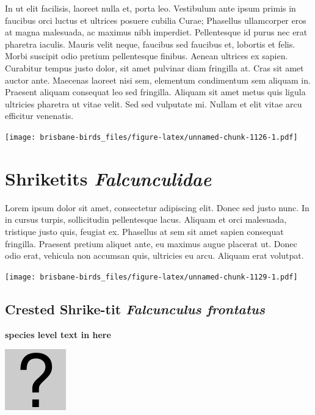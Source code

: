 \documentclass[]{book}
\let\origfigure\figure
\let\endorigfigure\endfigure
\renewenvironment{figure}[1][2] {
  \expandafter\origfigure\expandafter[H]
} {
  \endorigfigure
}
\begin{document}
In ut elit facilisis, laoreet nulla et, porta leo. Vestibulum ante ipsum
primis in faucibus orci luctus et ultrices posuere cubilia Curae;
Phasellus ullamcorper eros at magna malesuada, ac maximus nibh
imperdiet. Pellentesque id purus nec erat pharetra iaculis. Mauris velit
neque, faucibus sed faucibus et, lobortis et felis. Morbi suscipit odio
pretium pellentesque finibus. Aenean ultrices ex sapien. Curabitur
tempus justo dolor, sit amet pulvinar diam fringilla at. Cras sit amet
auctor ante. Maecenas laoreet nisi sem, elementum condimentum sem
aliquam in. Praesent aliquam consequat leo sed fringilla. Aliquam sit
amet metus quis ligula ultricies pharetra ut vitae velit. Sed sed
vulputate mi. Nullam et elit vitae arcu efficitur venenatis.

\begin{figure}
\centering
\texttt{[image: brisbane-birds\_files/figure-latex/unnamed-chunk-1126-1.pdf]}
\caption{\label{fig:unnamed-chunk-1126}insert figure caption}
\end{figure}

\chapter{\texorpdfstring{Shriketits
\emph{Falcunculidae}}{Shriketits Falcunculidae}}\label{shriketits-falcunculidae}

Lorem ipsum dolor sit amet, consectetur adipiscing elit. Donec sed justo
nunc. In in cursus turpis, sollicitudin pellentesque lacus. Aliquam et
orci malesuada, tristique justo quis, feugiat ex. Phasellus at sem sit
amet sapien consequat fringilla. Praesent pretium aliquet ante, eu
maximus augue placerat ut. Donec odio erat, vehicula non accumsan quis,
ultricies eu arcu. Aliquam erat volutpat.

\texttt{[image: brisbane-birds\_files/figure-latex/unnamed-chunk-1129-1.pdf]}

\section{\texorpdfstring{Crested Shrike-tit \emph{Falcunculus
frontatus}}{Crested Shrike-tit Falcunculus frontatus}}\label{crested-shrike-tit-falcunculus-frontatus}

\textbf{species level text in here}

\begin{figure}
\centering
\includegraphics{assets/missing.png}
\caption{No image for species}
\end{figure}
\end{document}
